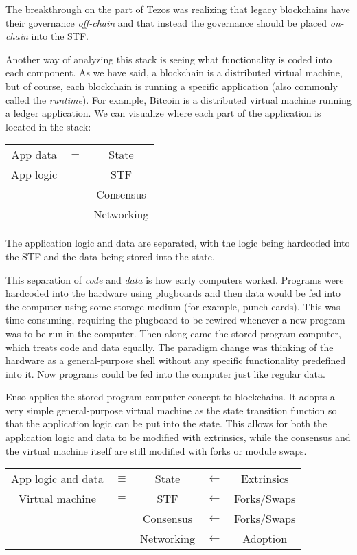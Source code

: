 \documentclass[conference]{IEEEtran}
\begin{document}
The breakthrough on the part of Tezos was realizing that legacy blockchains have their governance \textit{off-chain} and that instead the governance should be placed \textit{on-chain} into the STF.

Another way of analyzing this stack is seeing what functionality is coded into each component. As we have said, a blockchain is a distributed virtual machine, but of course, each blockchain is running a specific application (also commonly called the \textit{runtime}). For example, Bitcoin is a distributed virtual machine running a ledger application. We can visualize where each part of the application is located in the stack:

\begin{center}
	\begin{tabular}{c c c}
		App data & $\equiv$ & State\\
		\cline{1-1} \cline{3-3}
		App logic & $\equiv$ & STF\\
		\cline{3-3}
		 &  & Consensus\\
		\cline{3-3}
		&  & Networking
	\end{tabular}
\end{center}

The application logic and data are separated, with the logic being hardcoded into the STF and the data being stored into the state.

This separation of \textit{code} and \textit{data} is how early computers worked. Programs were hardcoded into the hardware using plugboards and then data would be fed into the computer using some storage medium (for example, punch cards). This was time-consuming, requiring the plugboard to be rewired whenever a new program was to be run in the computer. Then along came the stored-program computer, which treats code and data equally. The paradigm change was thinking of the hardware as a general-purpose shell without any specific functionality predefined into it. Now programs could be fed into the computer just like regular data.

Enso applies the stored-program computer concept to blockchains. It adopts a very simple general-purpose virtual machine as the state transition function so that the application logic can be put into the state. This allows for both the application logic and data to be modified with extrinsics, while the consensus and the virtual machine itself are still modified with forks or module swaps.

\begin{center}
	\begin{tabular}{c c c c c}
		App logic and data & $\equiv$ & State & $\leftarrow$ & Extrinsics\\
		\cline{1-1} \cline{3-3}
		Virtual machine & $\equiv$ & STF & $\leftarrow$ & Forks/Swaps\\
		\cline{3-3}
		 &  & Consensus & $\leftarrow$ & Forks/Swaps\\
		\cline{3-3}
		 & & Networking & $\leftarrow$ & Adoption
	\end{tabular}
\end{center}
\end{document}

